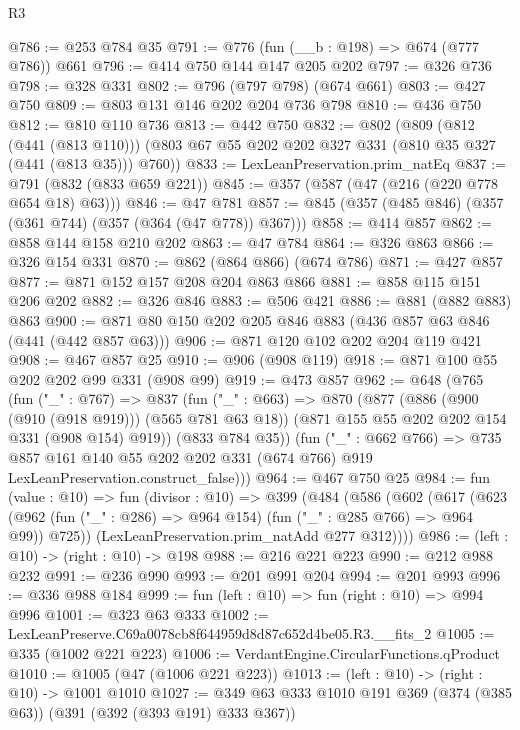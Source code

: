 \begin{lexlean}{R3}
\begin{coremodule}
@786 := @253 @784 @35
@791 := @776 (fun (__b : @198) => @674 (@777 @786)) @661
@796 := @414 @750 @144 @147 @205 @202
@797 := @326 @736
@798 := @328 @331
@802 := @796 (@797 @798) (@674 @661)
@803 := @427 @750
@809 := @803 @131 @146 @202 @204 @736 @798
@810 := @436 @750
@812 := @810 @110 @736
@813 := @442 @750
@832 := @802
    (@809
      (@812 (@441 (@813 @110)))
      (@803 @67 @55 @202 @202 @327 @331 (@810 @35 @327 (@441 (@813 @35))) @760))
@833 := LexLeanPreservation.prim_natEq
@837 := @791 (@832 (@833 @659 @221))
@845 := @357 (@587 (@47 (@216 (@220 @778 @654 @18) @63)))
@846 := @47 @781
@857 := @845 (@357 (@485 @846) (@357 (@361 @744) (@357 (@364 (@47 @778)) @367)))
@858 := @414 @857
@862 := @858 @144 @158 @210 @202
@863 := @47 @784
@864 := @326 @863
@866 := @326 @154 @331
@870 := @862 (@864 @866) (@674 @786)
@871 := @427 @857
@877 := @871 @152 @157 @208 @204 @863 @866
@881 := @858 @115 @151 @206 @202
@882 := @326 @846
@883 := @506 @421
@886 := @881 (@882 @883) @863
@900 := @871 @80 @150 @202 @205 @846 @883 (@436 @857 @63 @846 (@441 (@442 @857 @63)))
@906 := @871 @120 @102 @202 @204 @119 @421
@908 := @467 @857 @25
@910 := @906 (@908 @119)
@918 := @871 @100 @55 @202 @202 @99 @331 (@908 @99)
@919 := @473 @857
@962 := @648
    (@765
      (fun ("_" : @767) =>
      @837
        (fun ("_" : @663) =>
        @870
          (@877
            (@886 (@900 (@910 (@918 @919))) (@565 @781 @63 @18))
            (@871 @155 @55 @202 @202 @154 @331 (@908 @154) @919))
          (@833 @784 @35))
        (fun ("_" : @662 @766) =>
        @735
          @857
          @161
          @140
          @55
          @202
          @202
          @331
          (@674 @766)
          @919
          LexLeanPreservation.construct_false)))
@964 := @467 @750 @25
@984 := fun (value : @10) =>
  fun (divisor : @10) =>
  @399
    (@484
      (@586
        (@602
          (@617
            (@623 (@962 (fun ("_" : @286) => @964 @154) (fun ("_" : @285 @766) => @964 @99)) @725))
          (LexLeanPreservation.prim_natAdd @277 @312))))
@986 := (left : @10) -> (right : @10) -> @198
@988 := @216 @221 @223
@990 := @212 @988 @232
@991 := @236 @990
@993 := @201 @991 @204
@994 := @201 @993
@996 := @336 @988 @184
@999 := fun (left : @10) => fun (right : @10) => @994 @996
@1001 := @323 @63 @333
@1002 := LexLeanPreserve.C69a0078cb8f644959d8d87c652d4be05.R3.__fits_2
@1005 := @335 (@1002 @221 @223)
@1006 := VerdantEngine.CircularFunctions.qProduct
@1010 := @1005 (@47 (@1006 @221 @223))
@1013 := (left : @10) -> (right : @10) -> @1001 @1010
@1027 := @349 @63 @333 @1010 @191 @369 (@374 (@385 @63)) (@391 (@392 (@393 @191) @333 @367))

\end{coremodule}
\end{lexlean}

